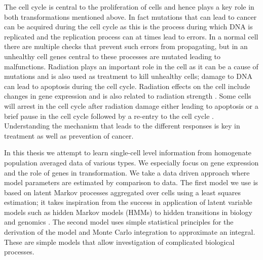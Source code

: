 The cell cycle is central to the proliferation of cells and hence plays a key role in both transformations mentioned above. In fact mutations that can lead to cancer can be acquired during the cell cycle as this is the process during which DNA is replicated and the replication process can at times lead to errors. In a normal cell there are multiple checks that prevent such errors from propagating, but in an unhealthy cell genes central to these processes are mutated leading to malfunctions. Radiation plays an important role in the cell as it can be a cause of mutations and is also used as treatment to kill unhealthy cells; damage to DNA can lead to apoptosis during the cell cycle. Radiation effects on the cell include changes in gene expression and is also related to radiation strength \citep{Gentile:2003in}. Some cells will arrest in the cell cycle after radiation damage either leading to apoptosis or a brief pause in the cell cycle followed by a re-entry to the cell cycle \citep{Pawlik2004928}. Understanding the mechanism that leads to the different responses is key in treatment as well as prevention of cancer.

In this thesis we attempt to learn single-cell level information from homogenate population averaged data of various types. We especially focus on gene expression and the role of genes in transformation. We take a data driven approach where model parameters are estimated by comparison to data. The first model we use is based on latent Markov processes aggregated over cells using a least squares estimation; it takes inspiration from the success in application of latent variable models such as hidden Markov models (HMMs) to hidden transitions in biology and genomics \citep{Yoon:2009dl,Ernst:2012iia}. The second model uses simple statistical principles for the derivation of the model and Monte Carlo integration to approximate an integral. These are simple models that allow investigation of complicated biological processes.


